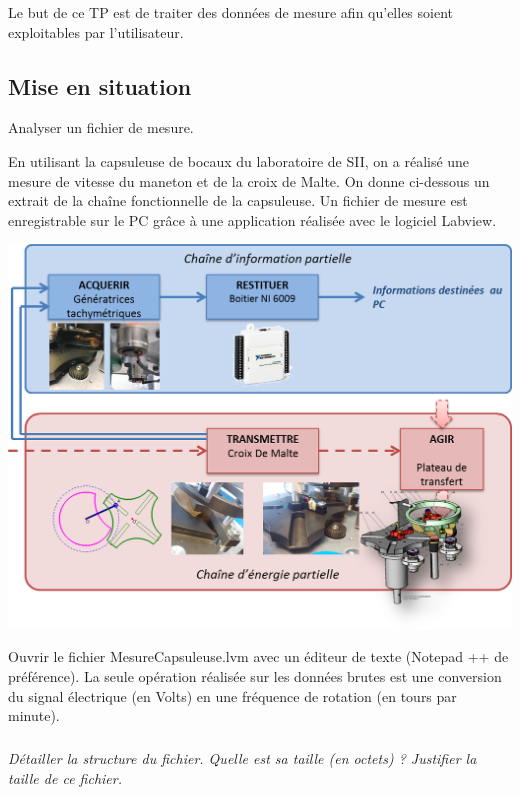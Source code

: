 \documentclass[10pt]{article}
\newif\ifxp
\begin{document}
\ifxp

\else

\fi



 \renewcommand{\baselinestretch}{1.2}
\setlength{\parskip}{2ex plus 0.5ex minus 0.2ex}


\begin{obj}
Le but de ce TP est de traiter des données de mesure afin qu'elles soient exploitables par l'utilisateur. 
\end{obj}

\subsection*{Mise en situation}
\begin{obj}
Analyser un fichier de mesure.
\end{obj}
En utilisant la capsuleuse de bocaux du laboratoire de SII, on a réalisé une mesure de vitesse du maneton et de la croix de Malte. On donne ci-dessous un extrait de la chaîne fonctionnelle de la capsuleuse. Un fichier de mesure est enregistrable sur le PC grâce à une application réalisée avec le logiciel Labview.

\begin{center}
\includegraphics[width=.8\textwidth]{images/CE_CI}
\end{center}

Ouvrir le fichier \textsf{MesureCapsuleuse.lvm} avec un éditeur de texte (Notepad ++ de préférence). La seule opération réalisée sur les données brutes est une conversion du signal électrique (en Volts) en une fréquence de rotation (en tours par minute).


\subparagraph{}
\textit{Détailler la structure du fichier. Quelle est sa taille (en octets) ? Justifier la taille de ce fichier.}
\end{document}
